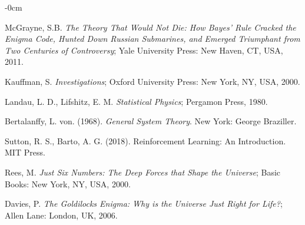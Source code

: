 \documentclass[entropy,article,submit,pdftex,moreauthors]{Definitions/mdpi}
\begin{document}
\begin{adjustwidth}{-\extralength}{0cm}
\begin{thebibliography}{999}
McGrayne, S.B. \textit{The Theory That Would Not Die: How Bayes' Rule Cracked the Enigma Code, Hunted Down Russian Submarines, and Emerged Triumphant from Two Centuries of Controversy}; Yale University Press: New Haven, CT, USA, 2011.

Kauffman, S. \textit{Investigations}; Oxford University Press: New York, NY, USA, 2000.

Landau, L. D., Lifshitz, E. M. \textit{Statistical Physics}; Pergamon Press, 1980.

Bertalanffy, L. von. (1968). \textit{General System Theory}. New York: George Braziller.

Sutton, R. S., Barto, A. G. (2018). Reinforcement Learning: An Introduction. MIT Press.

Rees, M. \textit{Just Six Numbers: The Deep Forces that Shape the Universe}; Basic Books: New York, NY, USA, 2000.

Davies, P. \textit{The Goldilocks Enigma: Why is the Universe Just Right for Life?}; Allen Lane: London, UK, 2006.


\end{thebibliography}

%


\PublishersNote{}
\end{adjustwidth}
\end{document}
